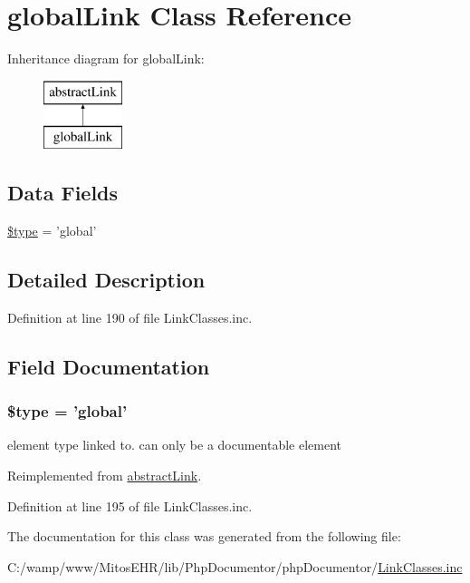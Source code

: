 \hypertarget{classglobal_link}{\section{global\-Link \-Class \-Reference}
\label{classglobal_link}
}
\-Inheritance diagram for global\-Link\-:\begin{figure}[H]
\begin{center}
\leavevmode
\includegraphics[height=2.000000cm]{classglobal_link}
\end{center}
\end{figure}
\subsection*{\-Data \-Fields}
\begin{DoxyCompactItemize}
\item 
\hyperlink{classglobal_link_a9a4a6fba2208984cabb3afacadf33919}{\$type} = 'global'
\end{DoxyCompactItemize}


\subsection{\-Detailed \-Description}


\-Definition at line 190 of file \-Link\-Classes.\-inc.



\subsection{\-Field \-Documentation}
\hypertarget{classglobal_link_a9a4a6fba2208984cabb3afacadf33919}{
\subsubsection[{\$type}]{\setlength{\rightskip}{0pt plus 5cm}\$type = 'global'}}\label{classglobal_link_a9a4a6fba2208984cabb3afacadf33919}
element type linked to. can only be a documentable element 

\-Reimplemented from \hyperlink{classabstract_link_a9a4a6fba2208984cabb3afacadf33919}{abstract\-Link}.



\-Definition at line 195 of file \-Link\-Classes.\-inc.



\-The documentation for this class was generated from the following file\-:\begin{DoxyCompactItemize}
\item 
\-C\-:/wamp/www/\-Mitos\-E\-H\-R/lib/\-Php\-Documentor/php\-Documentor/\hyperlink{_link_classes_8inc}{\-Link\-Classes.\-inc}\end{DoxyCompactItemize}
